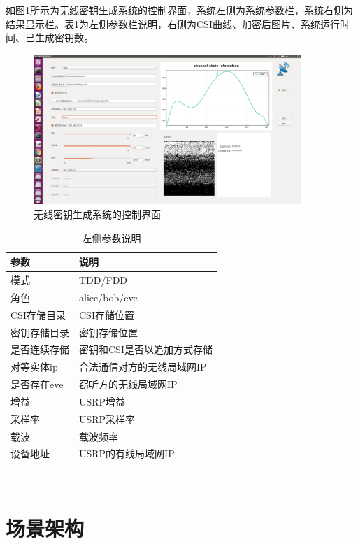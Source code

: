\documentclass[master]{seuthesis} %
\begin{document}
\begin{Main}
如图\ref{alice}所示为无线密钥生成系统的控制界面，系统左侧为系统参数栏，系统右侧为结果显示栏。表\ref{left-column-args}为左侧参数栏说明，右侧为CSI曲线、加密后图片、系统运行时间、已生成密钥数。

\begin{figure}[htbp!]
    \centering \includegraphics[width=0.9\textwidth]{images/alice}
    \caption{无线密钥生成系统的控制界面}
    \label{alice}
\end{figure}

\begin{table}[]
    \centering
    \begin{tabular}{|l|l|}
    \hline
    参数 & 说明 \\ \hline
    模式 & TDD/FDD \\ \hline
    角色 & alice/bob/eve \\ \hline
    CSI存储目录 & CSI存储位置 \\ \hline
    密钥存储目录 & 密钥存储位置 \\ \hline
    是否连续存储 & 密钥和CSI是否以追加方式存储 \\ \hline
    对等实体ip & 合法通信对方的无线局域网IP \\ \hline
    是否存在eve & 窃听方的无线局域网IP \\ \hline
    增益 & USRP增益 \\ \hline
    采样率 & USRP采样率 \\ \hline
    载波 & 载波频率 \\ \hline
    设备地址 & USRP的有线局域网IP \\ \hline
    \end{tabular}
    \caption{左侧参数说明
    \label{left-column-args}}
\end{table}
\
\section{场景架构}


\end{Main}
\end{document}
